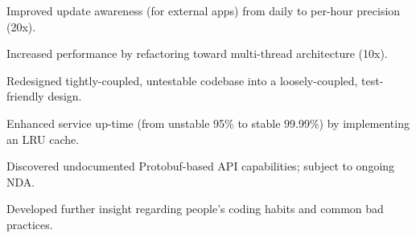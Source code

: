 \documentclass[10pt,a4paper]{article}
\begin{document}
\begin{customitemize}
    \item[] 
    \begin{customitemize}
        \item[] 
        \begin{customitemize}
            \item[] {}
            \item{Improved update awareness (for external apps) from daily to per-hour precision (20x).}
            \item{Increased performance by refactoring toward multi-thread architecture (10x).}
            \item{Redesigned tightly-coupled, untestable codebase into a loosely-coupled, test-friendly design.}
            \item{Enhanced service up-time (from unstable 95\% to stable 99.99\%) by implementing an LRU cache.}
        \end{customitemize}
        \item[] 
        \begin{customitemize}
            \item[] {}
            \item{Discovered undocumented Protobuf-based API capabilities; subject to ongoing NDA.}
        \end{customitemize}
        \item[] 
        \begin{customitemize}
            \item[] {}
            \item{Developed further insight regarding people's coding habits and common bad practices.}
        \end{customitemize}
    \end{customitemize}


\end{customitemize}
\end{document}
